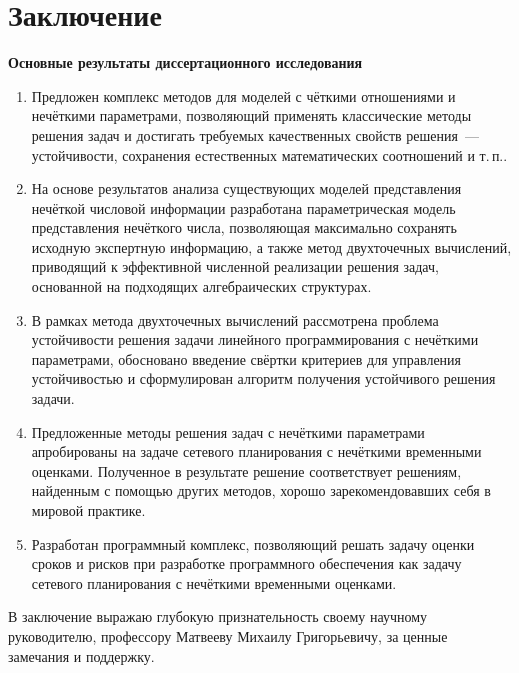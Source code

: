 \chapter*{Заключение}						%

\textbf{Основные результаты диссертационного исследования}
\begin{enumerate}
  \item Предложен комплекс методов для моделей с чёткими отношениями и нечёткими параметрами, позволяющий применять классические методы решения задач и достигать требуемых качественных свойств решения~--- устойчивости, сохранения естественных математических соотношений и т.\,п..
  \item На основе результатов анализа существующих моделей представления нечёткой числовой информации разработана параметрическая модель представления нечёткого числа, позволяющая максимально сохранять исходную экспертную информацию, а также метод двухточечных вычислений, приводящий к эффективной численной реализации решения задач, основанной на подходящих алгебраических структурах.
  \item В рамках метода двухточечных вычислений рассмотрена проблема устойчивости решения задачи линейного программирования с нечёткими параметрами, обосновано введение свёртки критериев для управления устойчивостью и сформулирован алгоритм получения устойчивого решения задачи.
  \item Предложенные методы решения задач с нечёткими параметрами апробированы на задаче сетевого планирования с нечёткими временными оценками. Полученное в результате решение соответствует решениям, найденным с помощью других методов, хорошо зарекомендовавших себя в мировой практике.
  \item Разработан программный комплекс, позволяющий решать задачу оценки сроков и рисков при разработке программного обеспечения как задачу сетевого планирования с нечёткими временными оценками.
\end{enumerate}

В заключение выражаю глубокую признательность своему научному руководителю, профессору Матвееву Михаилу Григорьевичу, за ценные замечания и поддержку.
\clearpage